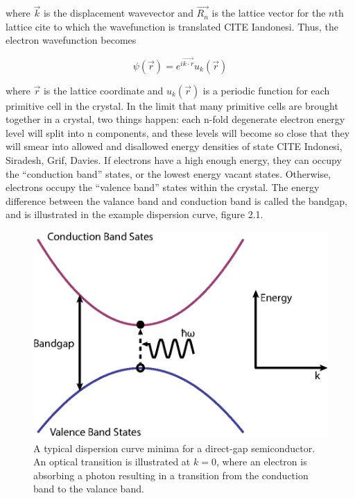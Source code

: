 where $\vec{k}$ is the displacement wavevector and  $\vec{R_n}$ is the lattice vector for the $n$th lattice cite to which the wavefunction is translated CITE Iandonesi. Thus, the electron wavefunction becomes 

 \begin{equation}
 \psi(\vec{r}) = e^{i \vec{k\cdot r}} u_k(\vec{r})
 \end{equation}
 
where $\vec{r}$ is the lattice coordinate and $u_k(\vec{r})$ is a periodic function for each primitive cell in the crystal. In the limit that many primitive cells are brought together in a crystal, two things happen: each n-fold degenerate electron energy level will split into n components, and these levels will become so close that they will smear into allowed and disallowed energy densities of state CITE Indonesi, Siradesh, Grif, Davies. If electrons have a high enough energy, they can occupy the ``conduction band'' states, or the lowest energy vacant states. Otherwise, electrons occupy the ``valence band'' states within the crystal. The energy difference between the valance band and conduction band is called the bandgap, and is illustrated in the example dispersion curve, figure 2.1. 

\begin{figure}[h!]
\centering
\includegraphics[width = .7\textwidth]{dispcurve.eps}
\caption{ \doublespacing A typical dispersion curve minima for a direct-gap semiconductor. An optical transition is illustrated at $k = 0$, where an electron is absorbing a photon resulting in a transition from the conduction band to the valance band.}
\label{ExampleBands}
\end{figure}

